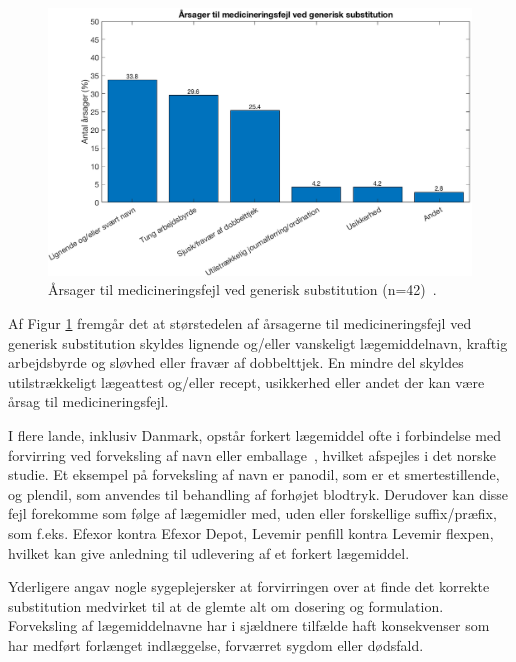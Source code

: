 \begin{figure}[H]\centering	\includegraphics[width=1\textwidth]{billeder/GenSub1.png} 
	\caption{Årsager til medicineringsfejl ved generisk substitution (n=42)~\citep{Hakonsen2010}.}	\label{fig:GeneriskSubstitution1}  
\end{figure}

Af Figur \ref{fig:GeneriskSubstitution1} fremgår det at størstedelen af årsagerne til medicineringsfejl ved generisk substitution skyldes lignende og/eller vanskeligt lægemiddelnavn, kraftig arbejdsbyrde og sløvhed eller fravær af dobbelttjek. En mindre del skyldes utilstrækkeligt lægeattest og/eller recept, usikkerhed eller andet der kan være årsag til medicineringsfejl. 

I flere lande, inklusiv Danmark, opstår forkert lægemiddel ofte i forbindelse med forvirring ved  forveksling af navn eller emballage~\citep{DanskSelskabforPatientsikkerhed2009}, hvilket afspejles i det norske studie. Et eksempel på forveksling af navn er panodil, som er et smertestillende, og plendil, som anvendes til behandling af forhøjet blodtryk. Derudover kan disse fejl forekomme som følge af lægemidler med, uden eller forskellige suffix/præfix, som f.eks. Efexor kontra Efexor Depot, Levemir penfill kontra Levemir flexpen, hvilket kan give anledning til udlevering af et forkert lægemiddel.~\citep{DanskSelskabforPatientsikkerhed2009}

Yderligere angav nogle sygeplejersker at forvirringen over at finde det korrekte substitution medvirket til at de glemte alt om dosering og formulation. Forveksling af lægemiddelnavne har i sjældnere tilfælde haft konsekvenser som har medført forlænget indlæggelse, forværret sygdom eller dødsfald.~\citep{DanskSelskabforPatientsikkerhed2009}


